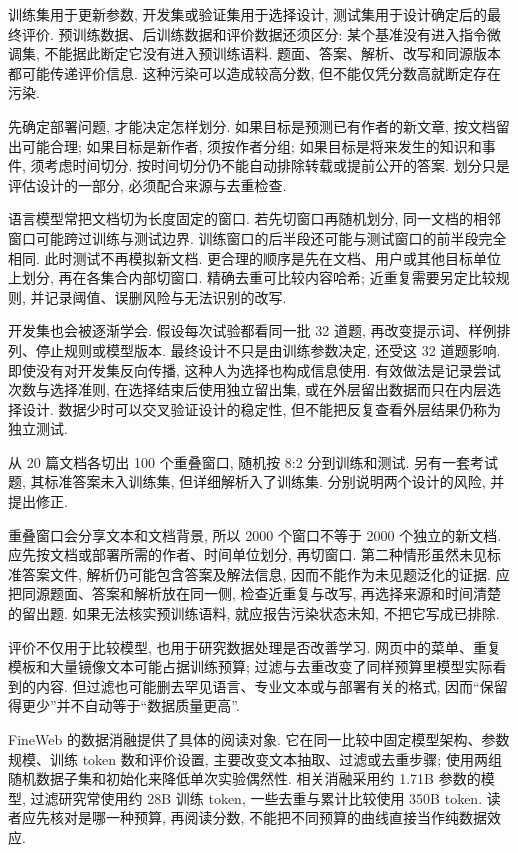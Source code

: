 训练集用于更新参数, 开发集或验证集用于选择设计, 测试集用于设计确定后的最终评价. 预训练数据、后训练数据和评价数据还须区分: 某个基准没有进入指令微调集, 不能据此断定它没有进入预训练语料. 题面、答案、解析、改写和同源版本都可能传递评价信息. 这种污染可以造成较高分数, 但不能仅凭分数高就断定存在污染.

先确定部署问题, 才能决定怎样划分. 如果目标是预测已有作者的新文章, 按文档留出可能合理; 如果目标是新作者, 须按作者分组; 如果目标是将来发生的知识和事件, 须考虑时间切分. 按时间切分仍不能自动排除转载或提前公开的答案. 划分只是评估设计的一部分, 必须配合来源与去重检查.

语言模型常把文档切为长度固定的窗口. 若先切窗口再随机划分, 同一文档的相邻窗口可能跨过训练与测试边界. 训练窗口的后半段还可能与测试窗口的前半段完全相同. 此时测试不再模拟新文档. 更合理的顺序是先在文档、用户或其他目标单位上划分, 再在各集合内部切窗口. 精确去重可比较内容哈希; 近重复需要另定比较规则, 并记录阈值、误删风险与无法识别的改写.

开发集也会被逐渐学会. 假设每次试验都看同一批 32 道题, 再改变提示词、样例排列、停止规则或模型版本. 最终设计不只是由训练参数决定, 还受这 32 道题影响. 即使没有对开发集反向传播, 这种人为选择也构成信息使用. 有效做法是记录尝试次数与选择准则, 在选择结束后使用独立留出集, 或在外层留出数据而只在内层选择设计. 数据少时可以交叉验证设计的稳定性, 但不能把反复查看外层结果仍称为独立测试.

\begin{exercise}
从 20 篇文档各切出 100 个重叠窗口, 随机按 8:2 分到训练和测试. 另有一套考试题, 其标准答案未入训练集, 但详细解析入了训练集. 分别说明两个设计的风险, 并提出修正.
\end{exercise}
\begin{solution}
重叠窗口会分享文本和文档背景, 所以 2000 个窗口不等于 2000 个独立的新文档. 应先按文档或部署所需的作者、时间单位划分, 再切窗口. 第二种情形虽然未见标准答案文件, 解析仍可能包含答案及解法信息, 因而不能作为未见题泛化的证据. 应把同源题面、答案和解析放在同一侧, 检查近重复与改写, 再选择来源和时间清楚的留出题. 如果无法核实预训练语料, 就应报告污染状态未知, 不把它写成已排除.
\end{solution}

评价不仅用于比较模型, 也用于研究数据处理是否改善学习. 网页中的菜单、重复模板和大量镜像文本可能占据训练预算; 过滤与去重改变了同样预算里模型实际看到的内容. 但过滤也可能删去罕见语言、专业文本或与部署有关的格式, 因而“保留得更少”并不自动等于“数据质量更高”.

FineWeb 的数据消融提供了具体的阅读对象\cite{fineweb}. 它在同一比较中固定模型架构、参数规模、训练 token 数和评价设置, 主要改变文本抽取、过滤或去重步骤; 使用两组随机数据子集和初始化来降低单次实验偶然性. 相关消融采用约 1.71B 参数的模型, 过滤研究常使用约 28B 训练 token, 一些去重与累计比较使用 350B token. 读者应先核对是哪一种预算, 再阅读分数, 不能把不同预算的曲线直接当作纯数据效应.

